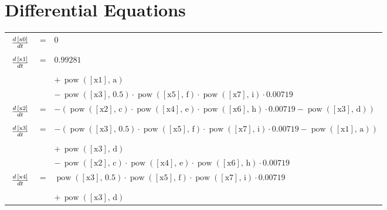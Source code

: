 \documentclass{article}
\begin{document}
\section*{Differential Equations}
\providecommand{\tabfrac}[2]{%
   \setlength{\fboxrule}{0pt}%
   \fbox{$\frac{#1}{#2}$}}
\begin{longtable}{lll}
$ \tabfrac{d\,\left[\mathrm{x0}\right]}{dt} $ &=& $ 0 $\\[5mm]
$ \tabfrac{d\,\left[\mathrm{x1}\right]}{dt} $ &=& $ 0.99281 $\\
 & & $ + \, \operatorname{pow}\left(\left[\mathrm{x1}\right],\,\mathrm{a}\right) $\\
 & & $ - \, \operatorname{pow}\left(\left[\mathrm{x3}\right],\,0.5\right) \cdot \operatorname{pow}\left(\left[\mathrm{x5}\right],\,\mathrm{f}\right) \cdot \operatorname{pow}\left(\left[\mathrm{x7}\right],\,\mathrm{i}\right) \cdot 0.00719 $\\[5mm]
$ \tabfrac{d\,\left[\mathrm{x2}\right]}{dt} $ &=& $ -\left(\operatorname{pow}\left(\left[\mathrm{x2}\right],\,\mathrm{c}\right) \cdot \operatorname{pow}\left(\left[\mathrm{x4}\right],\,\mathrm{e}\right) \cdot \operatorname{pow}\left(\left[\mathrm{x6}\right],\,\mathrm{h}\right) \cdot 0.00719 - \operatorname{pow}\left(\left[\mathrm{x3}\right],\,\mathrm{d}\right)\right) $\\[5mm]
$ \tabfrac{d\,\left[\mathrm{x3}\right]}{dt} $ &=& $ -\left(\operatorname{pow}\left(\left[\mathrm{x3}\right],\,0.5\right) \cdot \operatorname{pow}\left(\left[\mathrm{x5}\right],\,\mathrm{f}\right) \cdot \operatorname{pow}\left(\left[\mathrm{x7}\right],\,\mathrm{i}\right) \cdot 0.00719 - \operatorname{pow}\left(\left[\mathrm{x1}\right],\,\mathrm{a}\right)\right) $\\
 & & $ + \, \operatorname{pow}\left(\left[\mathrm{x3}\right],\,\mathrm{d}\right) $\\
 & & $ - \, \operatorname{pow}\left(\left[\mathrm{x2}\right],\,\mathrm{c}\right) \cdot \operatorname{pow}\left(\left[\mathrm{x4}\right],\,\mathrm{e}\right) \cdot \operatorname{pow}\left(\left[\mathrm{x6}\right],\,\mathrm{h}\right) \cdot 0.00719 $\\[5mm]
$ \tabfrac{d\,\left[\mathrm{x4}\right]}{dt} $ &=& $ \operatorname{pow}\left(\left[\mathrm{x3}\right],\,0.5\right) \cdot \operatorname{pow}\left(\left[\mathrm{x5}\right],\,\mathrm{f}\right) \cdot \operatorname{pow}\left(\left[\mathrm{x7}\right],\,\mathrm{i}\right) \cdot 0.00719 $\\
 & & $ + \, \operatorname{pow}\left(\left[\mathrm{x3}\right],\,\mathrm{d}\right) $\\

\end{longtable}
\end{document}
